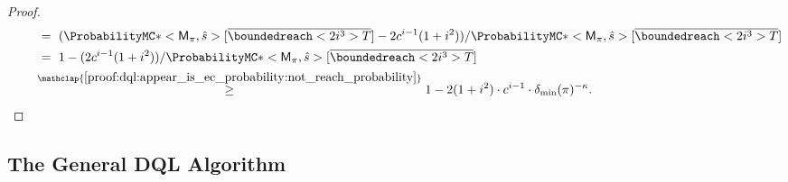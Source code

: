 \documentclass{article}
\newcommand{\unionSym}{\cup}
\newcommand{\unionBin}{\mathbin{\unionSym}}
\newcommand{\union}{\unionBin}
\DeclareMathOperator*{\argmax}{arg\,max}
\newcommand{\MC}{\mathsf{M}}
\newcommand{\States}{S}
\newcommand{\initialstate}{\hat{s}}
\newcommand{\strategy}{\pi}
\DeclareMathOperator{\val}{\mathcal{V}}
\newcommand{\upperbound}{\mathsf{Up}}
\newcommand{\lowerbound}{\mathsf{Lo}}
\newcommand{\targetset}{T}
\newcommand{\successor}{\mathsf{succ}}
\newcommand{\algostep}{\mathsf{t}}
\newcommand{\algoepisode}{\mathsf{e}}
\newcommand{\umaxactions}{\mathsf{MaxA}}
\begin{document}
\begin{proof}
\begin{align*}
		& \qquad ~=~ (\ProbabilityMC*<\MC_\strategy, \initialstate>[\overline{\boundedreach<2 i^3> \targetset}] - 2 c^{i - 1} (1 + i^2)) / \ProbabilityMC*<\MC_\strategy, \initialstate>[\overline{\boundedreach<2 i^3> \targetset}] \\
		& \qquad ~=~ 1 - (2 c^{i - 1} (1 + i^2)) / \ProbabilityMC*<\MC_\strategy, \initialstate>[\overline{\boundedreach<2 i^3> \targetset}] \\
		& \qquad \overset{\mathclap{\ref{proof:dql:appear_is_ec_probability:not_reach_probability}}}{~\geq~} 1 - 2 (1 + i^2) \cdot c^{i - 1} \cdot \delta_{\min}(\strategy)^{-\kappa}. \qedhere 
	\end{align*}
\end{proof}
\subsection{The General DQL Algorithm}
\newcommand{\algolimit}{\mathsf{i}}
\newcommand{\algocollapsedstates}{\mathsf{collapsed}}
\newcommand{\algozerostates}{\mathsf{Z}}
\newcommand{\algorepresentative}{\mathsf{rep}}

\end{document}
